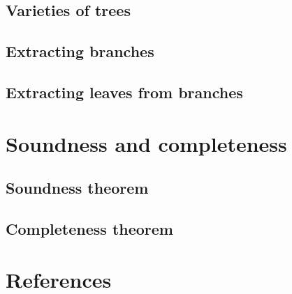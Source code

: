 \documentclass{article}
\begin{document}
\subsection{Varieties of trees}
\label{sec:varieties-trees}


\subsection{Extracting branches}
\label{sec:extracting-branches}


\subsection{Extracting leaves from branches}
\label{sec:extr-leav-from}


\section{Soundness and completeness}
\label{sec:soundn-compl}

\subsection{Soundness theorem}
\label{sec:soundness-theorem}


\subsection{Completeness theorem}
\label{sec:completeness-theorem}


\section{References}
\label{sec:references}

\printbibliography
\end{document}
